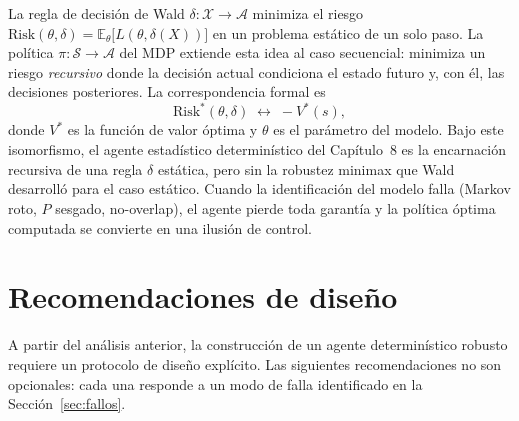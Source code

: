 \documentclass[12pt, a4paper]{article}
\theoremstyle{plain}
\theoremstyle{definition}
\newcommand{\cS}{\mathcal{S}}
\newcommand{\cA}{\mathcal{A}}
\newcommand{\Phat}{\widehat{P}}
\newcommand{\risk}{\mathrm{Risk}}
\begin{document}
La regla de decisión de Wald $\delta:\mathcal{X}\to\cA$ minimiza el
riesgo $\risk(\theta,\delta)=\mathbb{E}_{\theta}\bigl[L(\theta,\delta(X))\bigr]$
en un problema estático de un solo paso. La política $\pi:\cS\to\cA$ del
MDP extiende esta idea al caso secuencial: minimiza un riesgo
\emph{recursivo} donde la decisión actual condiciona el estado futuro y,
con él, las decisiones posteriores. La correspondencia formal es
\[
  \risk^{*}(\theta,\delta)\;\longleftrightarrow\;-V^{*}(s),
\]
donde $V^{*}$ es la función de valor óptima y $\theta$ es el parámetro
del modelo. Bajo este isomorfismo, el agente estadístico determinístico
del Capítulo~8 es la encarnación recursiva de una regla $\delta$
estática, pero sin la robustez minimax que Wald desarrolló para el caso
estático. Cuando la identificación del modelo falla (Markov roto,
$\Phat$ sesgado, no-overlap), el agente pierde toda garantía y la
política óptima computada se convierte en una ilusión de control.

\section{Recomendaciones de diseño}
\label{sec:recomendaciones}

A partir del análisis anterior, la construcción de un agente
determinístico robusto requiere un protocolo de diseño explícito. Las
siguientes recomendaciones no son opcionales: cada una responde a un
modo de falla identificado en la Sección~\ref{sec:fallos}.
\end{document}
